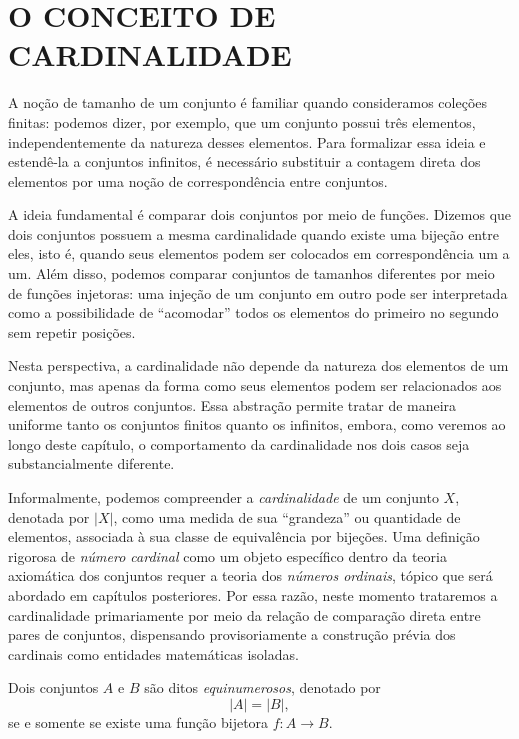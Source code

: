 
\chapter{O CONCEITO DE CARDINALIDADE}
\label{chap:cardinalidade}

A noção de tamanho de um conjunto é familiar quando consideramos coleções finitas: podemos dizer, por exemplo, que um conjunto possui três elementos, independentemente da natureza desses elementos. Para formalizar essa ideia e estendê-la a conjuntos infinitos, é necessário substituir a contagem direta dos elementos por uma noção de correspondência entre conjuntos.

A ideia fundamental é comparar dois conjuntos por meio de funções. Dizemos que dois conjuntos possuem a mesma cardinalidade quando existe uma bijeção entre eles, isto é, quando seus elementos podem ser colocados em correspondência um a um. Além disso, podemos comparar conjuntos de tamanhos diferentes por meio de funções injetoras: uma injeção de um conjunto em outro pode ser interpretada como a possibilidade de ``acomodar'' todos os elementos do primeiro no segundo sem repetir posições.

Nesta perspectiva, a cardinalidade não depende da natureza dos elementos de um conjunto, mas apenas da forma como seus elementos podem ser relacionados aos elementos de outros conjuntos. Essa abstração permite tratar de maneira uniforme tanto os conjuntos finitos quanto os infinitos, embora, como veremos ao longo deste capítulo, o comportamento da cardinalidade nos dois casos seja substancialmente diferente.

Informalmente, podemos compreender a \emph{cardinalidade} de um conjunto \(X\), denotada por \(|X|\), como uma medida de sua ``grandeza'' ou quantidade de elementos, associada à sua classe de equivalência por bijeções. Uma definição rigorosa de \emph{número cardinal} como um objeto específico dentro da teoria axiomática dos conjuntos requer a teoria dos \emph{números ordinais}, tópico que será abordado em capítulos posteriores. Por essa razão, neste momento trataremos a cardinalidade primariamente por meio da relação de comparação direta entre pares de conjuntos, dispensando provisoriamente a construção prévia dos cardinais como entidades matemáticas isoladas.

\begin{definicao}[Equinumerosidade]
    \label{def:equinumerosidade}
    Dois conjuntos \(A\) e \(B\) são ditos \emph{equinumerosos}, denotado por
    \[
        |A| = |B|,
    \]
    se e somente se existe uma função bijetora \(f:A\to B\).
\end{definicao}

